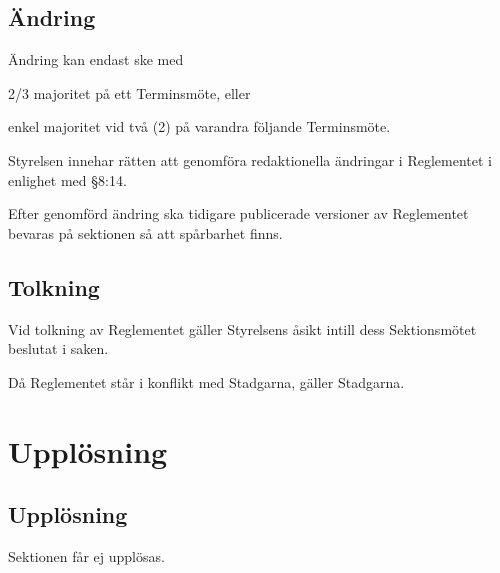 \documentclass[10pt]{article}
\begin{document}
    \subsection{Ändring}
    Ändring kan endast ske med
    \begin{alphlist}
    \item 2/3 majoritet på ett Terminsmöte, eller
    \item enkel majoritet vid två (2) på varandra följande Terminsmöte.
    \end{alphlist}

    Styrelsen innehar rätten att genomföra redaktionella ändringar i Reglementet i enlighet med §8:14.
    
    Efter genomförd ändring ska tidigare publicerade versioner av Reglementet bevaras på sektionen så att spårbarhet finns.
    
    \subsection{Tolkning}
    Vid tolkning av Reglementet gäller Styrelsens åsikt intill dess Sektionsmötet
    beslutat i saken.
    
    Då Reglementet står i konflikt med Stadgarna, gäller Stadgarna.
    
    \newpage
    \section{Upplösning}
    \subsection{Upplösning}
    Sektionen får ej upplösas.
    \newpage
    
\end{document}
